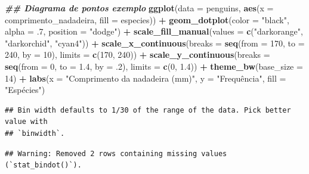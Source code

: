 \documentclass[
]{article}
\newenvironment{Shaded}{\begin{snugshade}}{\end{snugshade}}
\newcommand{\AttributeTok}[1]{\textcolor[rgb]{0.13,0.29,0.53}{#1}}
\newcommand{\DecValTok}[1]{\textcolor[rgb]{0.00,0.00,0.81}{#1}}
\newcommand{\DocumentationTok}[1]{\textcolor[rgb]{0.56,0.35,0.01}{\textbf{\textit{#1}}}}
\newcommand{\FloatTok}[1]{\textcolor[rgb]{0.00,0.00,0.81}{#1}}
\newcommand{\FunctionTok}[1]{\textcolor[rgb]{0.13,0.29,0.53}{\textbf{#1}}}
\newcommand{\NormalTok}[1]{#1}
\newcommand{\SpecialCharTok}[1]{\textcolor[rgb]{0.81,0.36,0.00}{\textbf{#1}}}
\newcommand{\StringTok}[1]{\textcolor[rgb]{0.31,0.60,0.02}{#1}}
\begin{document}
\begin{Shaded}
\begin{Highlighting}[]
\DocumentationTok{\#\# Diagrama de pontos exemplo}
\FunctionTok{ggplot}\NormalTok{(}\AttributeTok{data =}\NormalTok{ penguins, }
       \FunctionTok{aes}\NormalTok{(}\AttributeTok{x =}\NormalTok{ comprimento\_nadadeira, }\AttributeTok{fill =}\NormalTok{ especies)) }\SpecialCharTok{+}
    \FunctionTok{geom\_dotplot}\NormalTok{(}\AttributeTok{color =} \StringTok{"black"}\NormalTok{, }\AttributeTok{alpha =}\NormalTok{ .}\DecValTok{7}\NormalTok{, }\AttributeTok{position =} \StringTok{"dodge"}\NormalTok{) }\SpecialCharTok{+}
    \FunctionTok{scale\_fill\_manual}\NormalTok{(}\AttributeTok{values =} \FunctionTok{c}\NormalTok{(}\StringTok{"darkorange"}\NormalTok{, }\StringTok{"darkorchid"}\NormalTok{, }\StringTok{"cyan4"}\NormalTok{)) }\SpecialCharTok{+}
    \FunctionTok{scale\_x\_continuous}\NormalTok{(}\AttributeTok{breaks =} \FunctionTok{seq}\NormalTok{(}\AttributeTok{from =} \DecValTok{170}\NormalTok{, }\AttributeTok{to =} \DecValTok{240}\NormalTok{, }\AttributeTok{by =} \DecValTok{10}\NormalTok{), }\AttributeTok{limits =} \FunctionTok{c}\NormalTok{(}\DecValTok{170}\NormalTok{, }\DecValTok{240}\NormalTok{)) }\SpecialCharTok{+}
    \FunctionTok{scale\_y\_continuous}\NormalTok{(}\AttributeTok{breaks =} \FunctionTok{seq}\NormalTok{(}\AttributeTok{from =} \DecValTok{0}\NormalTok{, }\AttributeTok{to =} \FloatTok{1.4}\NormalTok{, }\AttributeTok{by =}\NormalTok{ .}\DecValTok{2}\NormalTok{), }\AttributeTok{limits =} \FunctionTok{c}\NormalTok{(}\DecValTok{0}\NormalTok{, }\FloatTok{1.4}\NormalTok{)) }\SpecialCharTok{+}
    \FunctionTok{theme\_bw}\NormalTok{(}\AttributeTok{base\_size =} \DecValTok{14}\NormalTok{) }\SpecialCharTok{+}
    \FunctionTok{labs}\NormalTok{(}\AttributeTok{x =} \StringTok{"Comprimento da nadadeira (mm)"}\NormalTok{, }\AttributeTok{y =} \StringTok{"Frequência"}\NormalTok{, }\AttributeTok{fill =} \StringTok{"Espécies"}\NormalTok{)}
\end{Highlighting}
\end{Shaded}

\begin{verbatim}
## Bin width defaults to 1/30 of the range of the data. Pick better value with
## `binwidth`.
\end{verbatim}

\begin{verbatim}
## Warning: Removed 2 rows containing missing values (`stat_bindot()`).
\end{verbatim}
\end{document}
